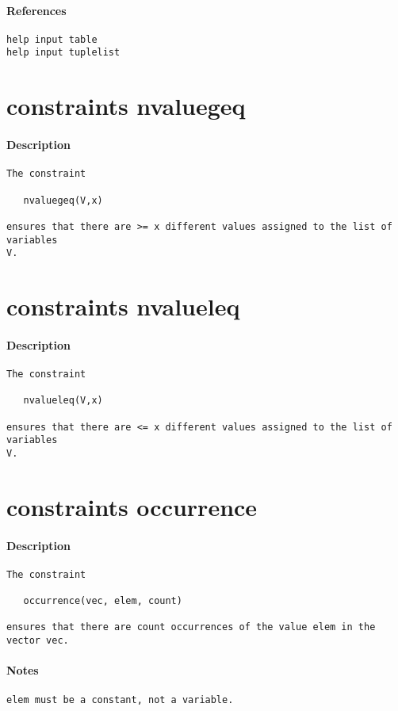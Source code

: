\paragraph{References}
{\footnotesize
\begin{verbatim}
help input table
help input tuplelist
\end{verbatim}
}
\section{constraints nvaluegeq}
\paragraph{Description}
{\footnotesize
\begin{verbatim}
The constraint

   nvaluegeq(V,x)

ensures that there are >= x different values assigned to the list of variables
V.
\end{verbatim}
}
\section{constraints nvalueleq}
\paragraph{Description}
{\footnotesize
\begin{verbatim}
The constraint

   nvalueleq(V,x)

ensures that there are <= x different values assigned to the list of variables
V.
\end{verbatim}
}
\section{constraints occurrence}
\paragraph{Description}
{\footnotesize
\begin{verbatim}
The constraint

   occurrence(vec, elem, count)

ensures that there are count occurrences of the value elem in the
vector vec.
\end{verbatim}
}
\paragraph{Notes}
{\footnotesize
\begin{verbatim}
elem must be a constant, not a variable.
\end{verbatim}
}
